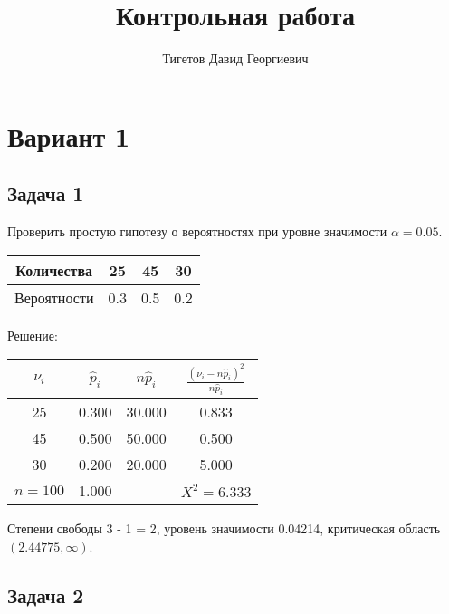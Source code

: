 \documentclass[a4paper,12pt]{article}
\begin{document}
\title{Контрольная работа}
\author{Тигетов Давид Георгиевич}
\maketitle

\section*{Вариант 1}

\subsection*{Задача 1}

Проверить простую гипотезу о вероятностях при уровне значимости $\alpha = 0.05$.

\begin{tabular}{|c|c|c|c|}
    \hline
    Количества  & 25  & 45  & 30  \\
    \hline
    Вероятности & 0.3 & 0.5 & 0.2 \\
    \hline
\end{tabular}

Решение:

\begin{tabular}{|c|c|c|c|}
    \hline
    $\nu_i$   & $\widehat{p}_i$ & $n \widehat{p}_i$ & $\frac{(\nu_i - n \widehat{p}_i)^2}{n \widehat{p}_i}$ \\
    \hline
    25        & 0.300           & 30.000            & 0.833                                                 \\
    45        & 0.500           & 50.000            & 0.500                                                 \\
    30        & 0.200           & 20.000            & 5.000                                                 \\
    \hline
    $n = 100$ & 1.000           &                   & $X^2 = 6.333$                                         \\
    \hline
\end{tabular}

Степени свободы 3 - 1 = 2, уровень значимости 0.04214, критическая область $(2.44775, \infty)$.



\subsection*{Задача 2}
\end{document}
